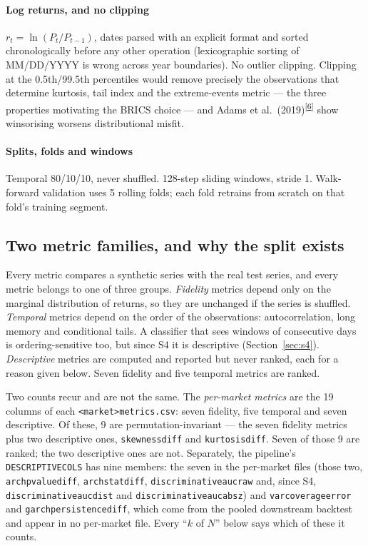 \documentclass[11pt,a4paper]{article}
\makeatletter
\newcommand{\tcite}[1]{\textsuperscript{[\hyperlink{R:#1}{#1}]}}
\DeclareRobustCommand{\_}{\ifmmode\nfss@text{\textunderscore}\else\textunderscore\allowbreak\fi}
\makeatother
\begin{document}
\paragraph{Log returns, and no clipping} $r_t = \ln(P_t/P_{t-1})$, dates parsed with an explicit format and sorted chronologically before any other operation (lexicographic sorting of MM/DD/YYYY is wrong across year boundaries). No outlier clipping. Clipping at the 0.5th/99.5th percentiles would remove precisely the observations that determine kurtosis, tail index and the extreme-events metric --- the three properties motivating the BRICS choice --- and Adams et al.\ (2019)\tcite{6} show winsorising worsens distributional misfit.

\paragraph{Splits, folds and windows} Temporal 80/10/10, never shuffled. 128-step sliding windows, stride 1. Walk-forward validation uses 5 rolling folds; each fold retrains from scratch on that fold's training segment.

\subsection{Two metric families, and why the split exists}
\label{sec:families}
Every metric compares a synthetic series with the real test series, and every metric belongs to one of three groups. \emph{Fidelity} metrics depend only on the marginal distribution of returns, so they are unchanged if the series is shuffled. \emph{Temporal} metrics depend on the order of the observations: autocorrelation, long memory and conditional tails. A classifier that sees windows of consecutive days is ordering-sensitive too, but since S4 it is descriptive (Section~\ref{sec:s4}). \emph{Descriptive} metrics are computed and reported but never ranked, each for a reason given below. Seven fidelity and five temporal metrics are ranked.

Two counts recur and are not the same. The \emph{per-market metrics} are the 19 columns of each \texttt{<market>\_metrics.csv}: seven fidelity, five temporal and seven descriptive. Of these, 9 are permutation-invariant --- the seven fidelity metrics plus two descriptive ones, \texttt{skewness\_diff} and \texttt{kurtosis\_diff}. Seven of those 9 are ranked; the two descriptive ones are not. Separately, the pipeline's \texttt{DESCRIPTIVE\_COLS} has nine members: the seven in the per-market files (those two, \texttt{arch\_pvalue\_diff}, \texttt{arch\_stat\_diff}, \texttt{discriminative\_auc\_raw} and, since S4, \texttt{discriminative\_auc\_dist} and \texttt{discriminative\_auc\_absz}) and \texttt{var\_coverage\_error} and \texttt{garch\_persistence\_diff}, which come from the pooled downstream backtest and appear in no per-market file. Every ``$k$ of $N$'' below says which of these it counts.
\end{document}

